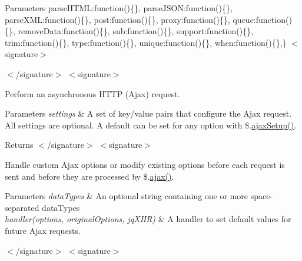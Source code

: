 \begin{DoxyParams}{Parameters}
\textquotesingle{}parse\+H\+T\+ML\textquotesingle{}\+:function()\{\}, \textquotesingle{}parse\+J\+S\+ON\textquotesingle{}\+:function()\{\}, \textquotesingle{}parse\+X\+ML\textquotesingle{}\+:function()\{\}, \textquotesingle{}post\textquotesingle{}\+:function()\{\}, \textquotesingle{}proxy\textquotesingle{}\+:function()\{\}, \textquotesingle{}queue\textquotesingle{}\+:function()\{\}, \textquotesingle{}remove\+Data\textquotesingle{}\+:function()\{\}, \textquotesingle{}sub\textquotesingle{}\+:function()\{\}, \textquotesingle{}support\textquotesingle{}\+:function()\{\}, \textquotesingle{}trim\textquotesingle{}\+:function()\{\}, \textquotesingle{}type\textquotesingle{}\+:function()\{\}, \textquotesingle{}unique\textquotesingle{}\+:function()\{\}, \textquotesingle{}when\textquotesingle{}\+:function()\{\},\} $<$signature$>$ 
 $<$/signature$>$ $<$signature$>$ \\
\hline
\end{DoxyParams}
Perform an asynchronous H\+T\+TP (Ajax) request.


\begin{DoxyParams}{Parameters}
{\em settings} & A set of key/value pairs that configure the Ajax request. All settings are optional. A default can be set for any option with \$.\hyperlink{jquery-2_82_81-vsdoc_8js_a3b12f4f2a83dfdae4e81bcaeaf2a2f42}{ajax\+Setup()}.\\
\hline
\end{DoxyParams}
\begin{DoxyReturn}{Returns}
$<$/signature$>$ $<$signature$>$ 

Handle custom Ajax options or modify existing options before each request is sent and before they are processed by \$.\hyperlink{jquery-2_82_81-vsdoc_8js_a3c9e2ac71a76356869090140308936dc}{ajax()}.
\end{DoxyReturn}

\begin{DoxyParams}{Parameters}
{\em data\+Types} & An optional string containing one or more space-\/separated data\+Types\\
\hline
{\em handler(options, original\+Options, jq\+X\+H\+R)} & A handler to set default values for future Ajax requests.\\
\hline
\end{DoxyParams}
$<$/signature$>$ $<$signature$>$ 

